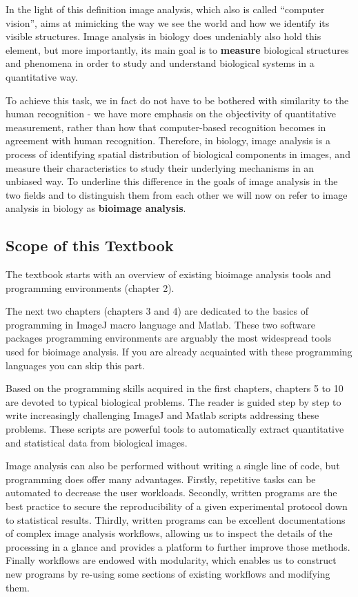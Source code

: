In the light of this definition image analysis, which also is called ``computer vision'',
aims at mimicking the way we see the world and how we identify its visible structures. Image
analysis in biology does undeniably also hold this element, but more importantly, its main goal is to \textbf{measure} biological structures and phenomena in order to study and understand biological systems in a quantitative way.



To achieve this task, we in fact do not have to be bothered with
similarity to the human recognition - we have more emphasis on the
objectivity of quantitative measurement, rather than how that
computer-based recognition becomes in agreement with human recognition.
Therefore, in biology, image analysis is a process of identifying
spatial distribution of biological components in images, and measure
their characteristics to study
their underlying mechanisms in an unbiased way. To underline this difference in the goals of image analysis in
the two fields and to distinguish them from each other we will now on refer to image analysis in biology as
\textbf{bioimage analysis}.

\subsection{Scope of this Textbook}\label{scope-of-this-textbook}

The textbook starts with an overview of existing bioimage analysis tools and programming environments (chapter 2).

The next two chapters (chapters 3 and 4) are dedicated to the basics of programming in ImageJ macro language and Matlab.  These two software packages programming environments are arguably the most widespread tools used for bioimage analysis. If you are already acquainted with these programming languages you can skip this part. 

Based on the programming skills acquired in the first chapters, chapters 5 to 10 are devoted to typical biological problems. The reader is guided step by step to write increasingly challenging ImageJ and Matlab scripts addressing these problems. These scripts are powerful tools to automatically extract quantitative and statistical data from biological images.


Image analysis can also be performed without writing a single line of code, but programming
does offer many advantages. 
Firstly, repetitive tasks can be automated to decrease the user workloads. 
Secondly, written programs are the best practice to secure the reproducibility of a given experimental protocol down to statistical results. 
Thirdly, written programs can be excellent documentations of
complex image analysis workflows, allowing us to inspect the details of the processing in a glance and provides a platform to further improve those methods.
Finally workflows are endowed with modularity, which enables us to construct new programs by re-using some sections of existing workflows and modifying them.


